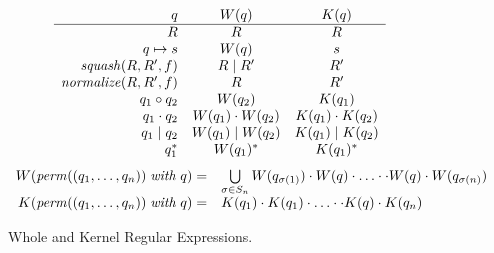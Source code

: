 \documentclass{svproc}
\newcommand{\squash}[3]{\ensuremath{\mathit{squash}(#1, #2, #3)}}
\newcommand{\perm}[2]{\ensuremath{\mathit{perm}(#1)\; \mathit{with}\; #2}}
\newcommand{\normalize}[3]{\ensuremath{\mathit{normalize}(#1, #2, #3)}}
\newcommand{\sep}{\ensuremath{\; | \;}}
\begin{document}
\begin{figure}[t]
  \centering
  \[
    \begin{array}{r@{\quad}c@{\quad}cc}
   
      q & W(q) & K(q) \\ \hline
      R & R & R \\
      q \mapsto s & W(q) & s \\
      \squash{R}{R'}{f} & R \sep R' & R' \\
      \normalize{R}{R'}{f} & R & R' \\
      q_1 \circ  q_2 & W(q_2) & K(q_1) \\
      q_1 \cdot q_2 & W(q_1) \cdot W(q_2) & K(q_1) \cdot K(q_2) \\
      q_1 \sep q_2 & W(q_1) \sep W(q_2) & K(q_1) \sep K(q_2) \\
      q_1^* & W(q_1)^* & K(q_1)^* \\
    \end{array}
  \]
\[
\begin{array}{r@{\quad}l}
W( \perm{(q_1, \ldots, q_n)}{q} ) = &
\bigcup \limits_{\sigma \in S_n} W(q_{\sigma(1)}) \cdot W(q) \cdot \ldots \cdot \cdot W(q) \cdot W(q_{\sigma(n)})
\\
K( \perm{(q_1, \ldots, q_n)}{q} ) = &
 K(q_1) \cdot K(q_1) \cdot \ldots \cdot \cdot K(q) \cdot K(q_n) 
\end{array}
\]
  \caption{Whole and Kernel Regular Expressions.}
  \label{fig:wk}
\end{figure}
\end{document}
